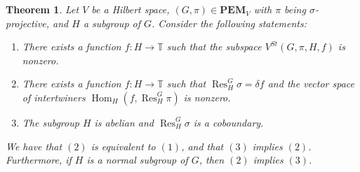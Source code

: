 \documentclass[11pt, oneside, reqno]{amsart}
\newcommand{\bbT}{\mathbb{T}}
\newcommand{\PEM}{\mathbf{PEM}}
\newcommand{\Hom}{\operatorname{Hom}}
\newcommand{\Res}{\operatorname{Res}}
\theoremstyle{definition}
\theoremstyle{plain}
\newtheorem{theorem}[definition]{Theorem}
\theoremstyle{remark}
\begin{document}
\begin{theorem}\label{thm:nonzero Stabilizer codes}
    Let $V$ be a Hilbert space, $(G,\pi) \in \PEM_V$ with $\pi$ being $\sigma$-projective, and $H$ a subgroup of $G$. Consider the following statements:
    \begin{enumerate}
        \item There exists a function $f \colon H \to \bbT$ such that the subspace $V^{St}(G,\pi,H,f)$ is nonzero.
        \item There exists a function $f \colon H \to \bbT$ such that $\Res^G_H\sigma = \delta f$  and the vector space of intertwiners $\Hom_H(f,\Res^G_H\pi)$ is nonzero.
        \item The subgroup $H$ is abelian and $\Res^G_H\sigma$ is a coboundary.
    \end{enumerate}
    We have that $(2)$ is equivalent to $(1)$, and that $(3)$ implies $(2)$. Furthermore, if $H$ is a normal subgroup of $G$, then $(2)$ implies $(3)$.
\end{theorem}
\end{document}
